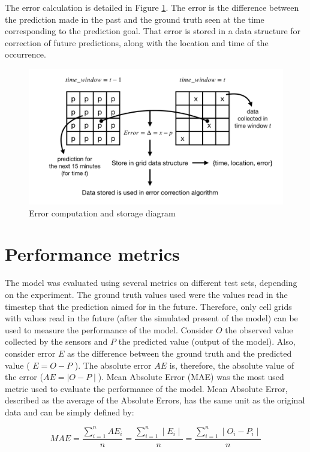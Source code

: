 The error calculation is detailed in Figure \ref{fig:delta_correction}. The error is the difference between the prediction made in the past and the ground truth seen at the time corresponding to the prediction goal.  That error is stored in a data structure for correction of future predictions, along with the location and time of the occurrence.

\begin{figure}[H]
\centering
\includegraphics[width=\linewidth]{images/delta_correction.png} 
\caption{Error computation and storage diagram}
\label{fig:delta_correction}
\vspace{1cm}
\end{figure}


\section{Performance metrics}
The model was evaluated using several metrics on different test sets, depending on the experiment. The ground truth values used were the values read in the timestep that the prediction aimed for in the future. Therefore, only cell grids with values read in the future (after the simulated present of the model) can be used to measure the performance of the model.
Consider $O$ the observed value collected by the sensors and $P$ the predicted value (output of the model). Also, consider error $E$ as the difference between the ground truth and the predicted value ( $E = O-P$ ). The absolute error $AE$ is, therefore, the absolute value of the error ($AE = \mid O-P \mid$).
Mean Absolute Error (MAE) was the most used metric used to evaluate the performance of the model. Mean Absolute Error, described as the average of the Absolute Errors, has the same unit as the original data and can be simply defined by:

\[MAE = \frac{\sum_{i=1}^{n} AE_i}{n} = \frac{\sum_{i=1}^{n} \mid E_i \mid}{n} = \frac{\sum_{i=1}^{n} \mid O_i-P_i \mid}{n}\]

